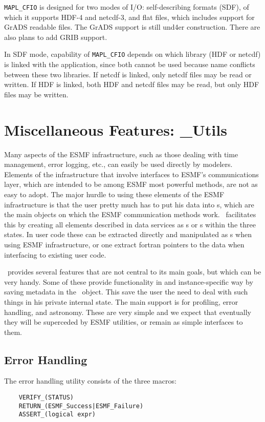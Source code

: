       {\tt MAPL\_CFIO} is designed for two modes of I/O: self-describing formats (SDF),
      of which it supports HDF-4 and netcdf-3, and flat files, which includes support
      for GrADS readable files. The GrADS support is still und4er construction. There
      are also plans to add GRIB support. 

      In SDF mode, capability of {\tt MAPL\_CFIO} depends on which library (HDF or netcdf)
      is linked with the application, since both cannot be used because
      name conflicts between these two libraries. If netcdf is linked, only netcdf 
      files may be read or written. If HDF is linked, both HDF and netcdf files may
      be read, but only HDF files may be written.
      

\section{Miscellaneous Features: \ggn\_Utils}


Many aspects of the ESMF infrastructure, such as those dealing with
time management, error logging, etc., can easily be used directly by
modelers. Elements of the infrastructure that involve interfaces to
ESMF's communications layer, which are intended to be among ESMF most
powerful methods, are not as easy to adopt. The major hurdle to using
these elements of the ESMF infrastructure is that the user pretty much
has to put his data into \fld s, which are the main objects on
which the ESMF communication methods work. \ggn\  facilitates this by
creating all elements described in data services as \fld s or \bdl s
within the three states. In user code these can be extracted directly
and manipulated as \fld s when using ESMF infrastructure,
or one extract fortran pointers to the data when interfacing to 
existing user code. 


\ggn\  provides several features that are not central to its main 
goals, but which can be very handy. Some of these provide
functionality in and instance-specific way by saving metadata in the
\ggn\  object. This save the user the need to deal with such things in
his private internal state. The main support is for profiling, error
handling, and astronomy. These are very simple and we expect that
eventually they will be superceded by ESMF utilities, or remain as
simple interfaces to them.

\subsection{Error Handling}
The error handling utility consists of the three macros:
\begin{verbatim}
    VERIFY_(STATUS)
    RETURN_(ESMF_Success|ESMF_Failure)
    ASSERT_(logical expr)
\end{verbatim}

